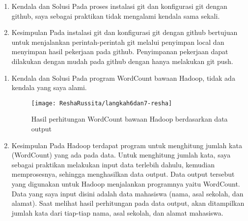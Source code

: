 \begin{enumerate}
\item Kendala dan Solusi
\newline Pada proses instalasi git dan konfigurasi git dengan github, saya sebagai praktikan tidak mengalami kendala sama sekali.

\item Kesimpulan
\newline Pada instalasi git dan konfigurasi git dengan github bertujuan untuk menjalankan perintah-perintah git melalui penyimpan local dan menyimpan hasil pekerjaan pada github. Penyimpanan pekerjaan dapat dilakukan dengan mudah pada github dengan hanya melakukan git push.

\end{enumerate}

\begin{enumerate}
\item Kendala dan Solusi
\newline Pada program WordCount bawaan Hadoop, tidak ada kendala yang saya alami.

\begin{figure}[!ht]
\texttt{[image: ReshaRussita/langkah6dan7-resha]}
\caption{Hasil perhitungan WordCount bawaan Hadoop berdasarkan data output}
\label{gam:perkuliahan-08-12}
\end{figure}

\item Kesimpulan
\newline Pada Hadoop terdapat program untuk menghitung jumlah kata (WordCount) yang ada pada data. Untuk menghitung jumlah kata, saya sebagai praktikan melakukan input data terlebih dahulu, kemudian memprosesnya, sehingga menghasilkan data output. Data output tersebut yang digunakan untuk Hadoop menjalankan programnya yaitu WordCount.
Data yang saya input disini adalah data mahasiswa (nama, asal sekolah, dan alamat). Saat melihat hasil perhitungan pada data output, akan ditampilkan jumlah kata dari tiap-tiap nama, asal sekolah, dan alamat mahasiswa.

\end{enumerate}

